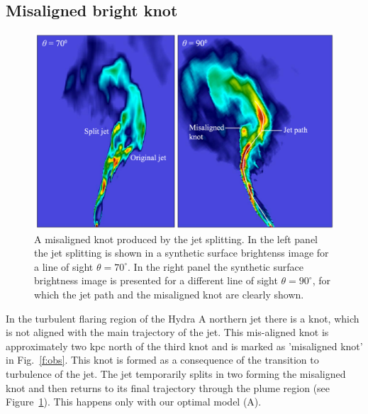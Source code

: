 \documentclass[useAMS, usenatbib]{mn2e}
\begin{document}
\subsection{Misaligned bright knot}
\begin{figure}
\centering
\includegraphics[width=\textwidth]{fig8.eps}
\caption{A misaligned knot produced by the jet splitting. In the left panel the jet splitting is shown in a synthetic surface brightenss image for a line of sight $\theta = 70^{\circ}$. In the right panel the synthetic surface brightness image is presented for a different line of sight $\theta = 90^{\circ}$, for which the jet path and the misaligned knot are clearly shown. }
\label{f:mknt}
\end{figure}

In the turbulent flaring region of the Hydra A northern jet there is a  knot, which is not aligned with the main trajectory of the jet. This mis-aligned knot is approximately two kpc north of the third knot and is marked as 'misaligned knot' in Fig.~\ref{f:obs}. This knot is formed as a consequence of the transition to turbulence of the jet. The jet temporarily splits in two forming the misaligned knot and then returns to its final trajectory through the plume region (see Figure~\ref{f:mknt}). This happens only with our optimal model (A).
\end{document}
